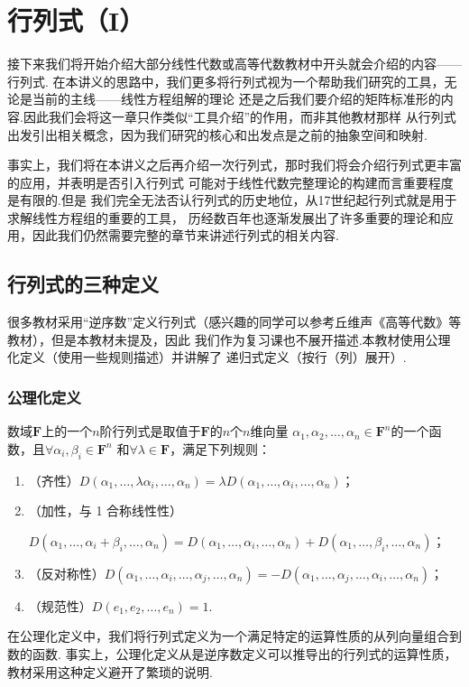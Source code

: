 \chapter{行列式（I）}

接下来我们将开始介绍大部分线性代数或高等代数教材中开头就会介绍的内容——行列式.
在本讲义的思路中，我们更多将行列式视为一个帮助我们研究的工具，无论是当前的主线——线性方程组解的理论
还是之后我们要介绍的矩阵标准形的内容.因此我们会将这一章只作类似``工具介绍''的作用，而非其他教材那样
从行列式出发引出相关概念，因为我们研究的核心和出发点是之前的抽象空间和映射.

事实上，我们将在本讲义之后再介绍一次行列式，那时我们将会介绍行列式更丰富的应用，并表明是否引入行列式
可能对于线性代数完整理论的构建而言重要程度是有限的.但是
我们完全无法否认行列式的历史地位，从17世纪起行列式就是用于求解线性方程组的重要的工具，
历经数百年也逐渐发展出了许多重要的理论和应用，因此我们仍然需要完整的章节来讲述行列式的相关内容.

\section{行列式的三种定义}
很多教材采用``逆序数''定义行列式（感兴趣的同学可以参考丘维声《高等代数》等教材），但是本教材未提及，因此
我们作为复习课也不展开描述.本教材使用公理化定义（使用一些规则描述）并讲解了
递归式定义（按行（列）展开）.

\subsection{公理化定义}
\begin{definition} \label{def:11:公理化定义}
    数域$\mathbf{F}$上的一个$n$阶行列式是取值于$\mathbf{F}$的$n$个$n$维向量
    $\alpha_1,\alpha_2,\ldots,\alpha_n \in \mathbf{F}^n$的一个函数，且$\forall \alpha_i,\beta_i \in \mathbf{F}^n$
    和$\forall \lambda \in \mathbf{F}$，满足下列规则：
    \begin{enumerate}
        \item（齐性）$D(\alpha_1,\ldots,\lambda\alpha_i,\ldots,\alpha_n)=\lambda D(\alpha_1,\ldots,\alpha_i,\ldots,\alpha_n)$；

        \item（加性，与 1 合称线性性）

        $D(\alpha_1,\ldots,\alpha_i+\beta_i,\ldots,\alpha_n)=D(\alpha_1,\ldots,\alpha_i,\ldots,\alpha_n)+D(\alpha_1,\ldots,\beta_i,\ldots,\alpha_n)$；

        \item（反对称性）$D(\alpha_1,\ldots,\alpha_i,\ldots,\alpha_j,\ldots,\alpha_n)=-D(\alpha_1,\ldots,\alpha_j,\ldots,\alpha_i,\ldots,\alpha_n)$；

        \item（规范性）$D(e_1,e_2,\ldots,e_n)=1$.
    \end{enumerate}
\end{definition}
在公理化定义中，我们将行列式定义为一个满足特定的运算性质的从列向量组合到数的函数.
事实上，公理化定义从是逆序数定义可以推导出的行列式的运算性质，教材采用这种定义避开了繁琐的说明.

